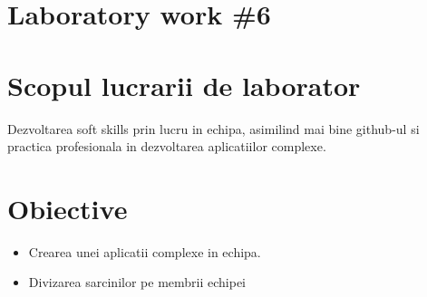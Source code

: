 \section*{Laboratory work \#6}

\section{Scopul lucrarii de laborator}
Dezvoltarea soft skills prin lucru in echipa, asimilind mai bine github-ul si practica profesionala in dezvoltarea aplicatiilor complexe.
\section{Obiective}

\begin{itemize}
	\item Crearea unei aplicatii complexe in echipa.
	\item Divizarea sarcinilor pe membrii echipei

\end{itemize}

\clearpage